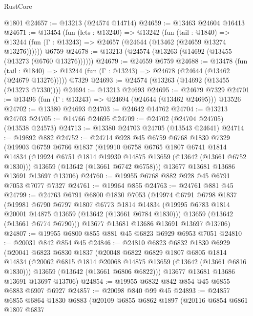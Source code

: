 \begin{lexlean}{RustCore}
\begin{coremodule}
    @1801
@24657 := @13213 (@24574 @14714)
@24659 := @13463 @24604 @16413
@24671 := @13454
    (fun (lets : @13240) =>
    @13242
      (fun (tail : @1840) =>
      @13244 (fun (Γ : @13243) => @24657 (@24644 (@13462 (@24659 @13274 @13276))))))
    @6759
@24678 := @13213 (@24574 (@13263 (@14692 (@13455 (@13273 (@6760 @13276))))))
@24679 := @24659 @6759
@24688 := @13478
    (fun (tail : @1840) => @13244 (fun (Γ : @13243) => @24678 (@24644 (@13462 (@24679 @13276)))))
    @7329
@24693 := @24574 (@13263 (@14692 (@13455 (@13273 @7330))))
@24694 := @13213 @24693
@24695 := @24679 @7329
@24701 := @13496 (fun (Γ : @13243) => @24694 (@24644 (@13462 @24695))) @13526
@24702 := @13380 @24693
@24703 := @24642 @14762
@24704 := @13213 @24703
@24705 := @14766 @24695
@24709 := @24702 (@24704 @24705) (@13538 @24573)
@24713 := @13380 @24703 @24705 (@13543 @24641)
@24714 := @19892 @882
@24752 := @24714
    @928
    @45
    @6759
    @6768
    @1830
    @7329
    (@19903
      @6759
      @6766
      @1837
      (@19910
        @6758
        @6765
        @1807
        @6741
        @1814
        @14834
        (@19924 @6751 @1814 @19930 @14875 @13659 (@13642 (@13661 @6752 @1830)))
        @13659
        (@13642 (@13661 @6742 @6758)))
      @13677
      @13681
      @13686
      @13691
      @13697
      @13706)
@24760 := @19955 @6768 @882 @928 @45 @6791 @7053 @7077 @7327
@24761 := @19964 @855
@24763 := @24761 @881 @45
@24799 := @24763
    @6791
    @6800
    @1830
    @7053
    (@19974
      @6791
      @6798
      @1837
      (@19981
        @6790
        @6797
        @1807
        @6773
        @1814
        @14834
        (@19995 @6783 @1814 @20001 @14875 @13659 (@13642 (@13661 @6784 @1830)))
        @13659
        (@13642 (@13661 @6774 @6790)))
      @13677
      @13681
      @13686
      @13691
      @13697
      @13706)
@24807 := @19955 @6800 @855 @881 @45 @6823 @6929 @6953 @7051
@24810 := @20031 @842 @854 @45
@24846 := @24810
    @6823
    @6832
    @1830
    @6929
    (@20041
      @6823
      @6830
      @1837
      (@20048
        @6822
        @6829
        @1807
        @6805
        @1814
        @14834
        (@20062 @6815 @1814 @20068 @14875 @13659 (@13642 (@13661 @6816 @1830)))
        @13659
        (@13642 (@13661 @6806 @6822)))
      @13677
      @13681
      @13686
      @13691
      @13697
      @13706)
@24854 := @19955 @6832 @842 @854 @45 @6855 @6883 @6907 @6927
@24857 := @20098 @840 @99 @45
@24893 := @24857
    @6855
    @6864
    @1830
    @6883
    (@20109
      @6855
      @6862
      @1897
      (@20116
        @6854
        @6861
        @1807
        @6837

\end{coremodule}
\end{lexlean}
